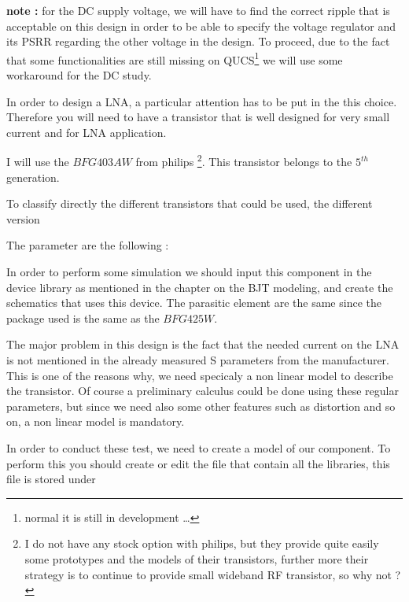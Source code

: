 \textbf{note :} for the DC supply voltage, we will have to find the correct ripple that is acceptable on this design in order to be able to specify the voltage regulator and its PSRR regarding the other voltage in the design. To proceed, due to the fact that some functionalities are still missing on QUCS\footnote{normal it is still in development \ldots} we will use some workaround for the DC study.



In order to design a LNA, a particular attention has to be put in the this choice. Therefore you will need to have a transistor that is well designed for very small current and for LNA application. 

I will    use the $BFG403AW$ from  philips \footnote{I do not have any stock option with philips, but they provide quite easily some prototypes and the models of their transistors, further more their strategy is to continue to provide small wideband RF transistor, so why not ?}. This transistor belongs to the $5^{th}$ generation. 

To classify directly the different transistors that could be used, the different version 

The parameter are the following :



In order to perform some simulation we should input this component in the device library as mentioned in the chapter on the BJT modeling, and create the schematics that uses this device. The parasitic element are the same since the package used is the same as the $BFG425W$.


The major problem in this design is the fact that the needed current on the LNA is not mentioned in the already measured S parameters from the manufacturer. This is one of the reasons why, we need specicaly a non linear model to describe the transistor. Of course a preliminary calculus could be done using these regular parameters, but since we need also some other features such as distortion and so on, a non linear model is mandatory.

\bigskip 

In order to conduct these test, we need to create a model of our component. To perform this you should create or edit the file that contain all the libraries, this file is stored under 

